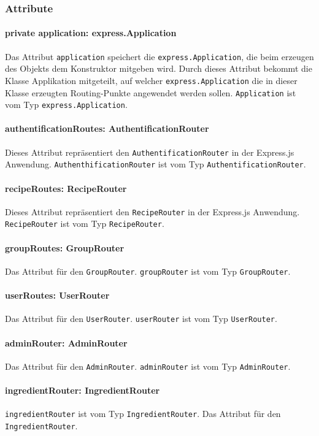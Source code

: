 \documentclass{entwurfsheft}
\begin{document}
\subsubsection*{Attribute}
\paragraph{private application: express.Application}
Das Attribut \texttt{application} speichert die \newline
\texttt{express.Application}, die beim erzeugen des Objekts dem Konstruktor mitgeben wird.
Durch dieses Attribut bekommt die Klasse Applikation mitgeteilt, auf welcher \texttt{express.Application} die in dieser Klasse erzeugten Routing-Punkte angewendet werden sollen.
\texttt{Application} ist vom Typ \texttt{express.Application}.
\paragraph{authentificationRoutes: AuthentificationRouter}
Dieses Attribut repräsentiert den \newline
\texttt{AuthentificationRouter} in der Express.js Anwendung. \texttt{AuthenthificationRouter} ist vom Typ \texttt{AuthentificationRouter}.
\paragraph{recipeRoutes: RecipeRouter}
Dieses Attribut repräsentiert den \texttt{RecipeRouter} in der Express.js Anwendung. \texttt{RecipeRouter} ist vom Typ \texttt{RecipeRouter}.
\paragraph{groupRoutes: GroupRouter}
Das Attribut für den \texttt{GroupRouter}. \texttt{groupRouter} ist vom \newline
Typ \texttt{GroupRouter}.
\paragraph{userRoutes: UserRouter}
Das Attribut für den \texttt{UserRouter}. \texttt{userRouter} ist vom Typ \newline
\texttt{UserRouter}.
\paragraph{adminRouter: AdminRouter}
Das Attribut für den \texttt{AdminRouter}. \texttt{adminRouter} ist vom Typ \texttt{AdminRouter}.
\paragraph{ingredientRouter: IngredientRouter}
\texttt{ingredientRouter} ist vom Typ \texttt{IngredientRouter}.
Das Attribut für den \texttt{IngredientRouter}. \newline
\end{document}
